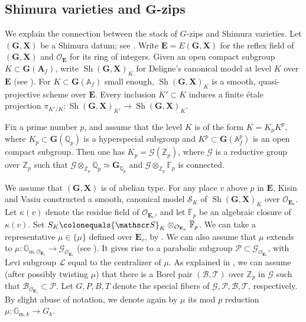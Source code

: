 \documentclass[11pt]{amsart}
\numberwithin{equation}{section}
\theoremstyle{definition}
\theoremstyle{remark}
\newcommand{\Ocal}{{\mathcal O}}
\renewcommand{\AA}{\mathbb{A}}
\newcommand{\FF}{\mathbb{F}}
\newcommand{\GG}{\mathbb{G}}
\newcommand{\QQ}{\mathbb{Q}}
\newcommand{\ZZ}{\mathbb{Z}}
\newcommand{\Bscr}{{\mathscr B}}
\newcommand{\Gscr}{{\mathscr G}}
\newcommand{\Lscr}{{\mathscr L}}
\newcommand{\Pscr}{{\mathscr P}}
\newcommand{\Sscr}{{\mathscr S}}
\newcommand{\Tscr}{{\mathscr T}}
\DeclareMathOperator{\Sh}{Sh}
\newcommand{\shgx}{\Sh(\mathbf G, \mathbf X)}
\newcommand{\egx}{E(\mathbf G, \mathbf X)}
\newcommand{\gx}{(\mathbf G, \mathbf X)}
\newcommand{\gofaf}{\mathbf G(\mathbf A_f)}
\begin{document}
\subsection{Shimura varieties and $\boldsymbol{G}$-zips} \label{subsec-Shimura}
We explain the connection between the stack of $G$-zips and Shimura varieties. Let $\gx$ be a Shimura datum; see \cite[Section~2.1.1]{Deligne-Shimura-varieties}. 
Write $\mathbf{E}=\egx$ for the reflex field of $\gx$ and $\Ocal_\mathbf{E}$ for its ring of integers. 
Given an open compact subgroup $K \subset \gofaf$, write $\shgx_{K}$ for Deligne's canonical model at level $K$ over $\mathbf{E}$ (see \cite{Deligne-Shimura-varieties}). For $K\subset \mathbf{G}(\AA_f)$ small enough, $\shgx_K$ is a smooth, quasi-projective scheme over $\mathbf{E}$. Every inclusion $K' \subset K$ induces a finite \'{e}tale projection $\pi_{K'/K} \colon \shgx_{K'} \to \shgx_{K}$.


Fix a prime number $p$, and assume that the level $K$ is of the form $K=K_pK^p$,  where $K_p\subset \mathbf{G}(\QQ_p)$ is a hyperspecial subgroup and $K^p\subset \mathbf{G}(\AA_f^p)$ is an open compact subgroup. Then one has $K_p=\Gscr(\ZZ_p)$, where $\Gscr$ is a reductive group over $\ZZ_p$ such that $\Gscr\otimes_{\ZZ_p}\QQ_p\simeq \mathbf{G}_{\QQ_p}$ and $\Gscr\otimes_{\ZZ_p}\mathbb{F}_p$ is connected. 

We assume that $\gx$ is of abelian type.
For any place $v$ above $p$ in $\mathbf{E}$, Kisin \cite{Kisin-Hodge-Type-Shimura} and Vasiu \cite{Vasiu-Preabelian-integral-canonical-models} constructed a smooth, canonical model $\Sscr_K$  of $\shgx_K$ over $\Ocal_{\mathbf{E}_v}$. Let $\kappa(v)$ denote the residue field of $\Ocal_{\mathbf{E}_v}$, and let $\overline{\FF}_p$ be an algebraic closure of $\kappa(v)$. Set $S_K\colonequals \Sscr_K\otimes_{\Ocal_{\mathbf{E}_v}} \overline{\FF}_p$. We can take a representative $\mu\in \{\mu\}$ defined over $\mathbf{E}_v$, by \cite[Lemma~(1.1.3)(a)]{Kottwitz-Shimura-twisted-orbital}. 
We can also assume that $\mu$ extends to $\mu \colon \GG_{\mathrm{m},\Ocal_{\mathbf{E}_v}}\to \mathscr{G}_{\Ocal_{\mathbf{E}_v}}$ (see \cite[Corollary 3.3.11]{Kim-Rapoport-Zink-uniformization}). It gives rise to a parabolic subgroup $\Pscr\subset \mathscr{G}_{\Ocal_{\mathbf{E}_v}}$, with Levi subgroup $\Lscr$ equal to the centralizer of $\mu$. As explained in \cite[Section~2.5]{Imai-Koskivirta-vector-bundles}, we can assume (after possibly twisting $\mu$) that there is a Borel pair $(\Bscr, \Tscr)$ over $\ZZ_p$ in $\Gscr$ such that $\mathscr{B}_{\Ocal_{\mathbf{E}_v}}\subset \Pscr$. Let $G,P,B,T$ denote the special fibers of $\Gscr, \Pscr, \Bscr, \Tscr$, respectively. By slight abuse of notation, we denote again by $\mu$ its mod $p$ reduction $\mu \colon \GG_{\mathrm{m},k}\to G_k$. 
\end{document}
